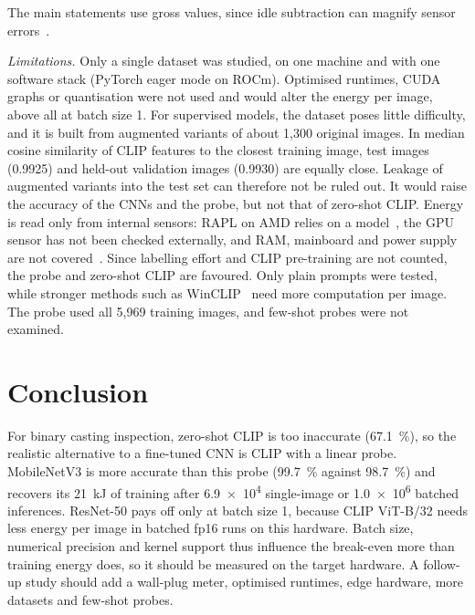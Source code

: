 \documentclass[conference]{IEEEtran}
\begin{document}
The main statements use gross values, since idle subtraction can magnify sensor
errors~\cite{fahad2019comparative}.

\emph{Limitations.} Only a single dataset was studied, on one machine and with one software stack
(PyTorch eager mode on ROCm). Optimised runtimes, CUDA graphs or quantisation were not used and would alter the energy per image,
above all at batch size 1. For supervised models, the dataset poses little difficulty, and it
is built from augmented variants of about 1,300 original images. In median cosine similarity of
CLIP features to the closest training image, test images (0.9925) and held-out validation images
(0.9930) are equally close. Leakage of augmented variants into the test set
can therefore not be ruled out. It would raise the accuracy of the CNNs and the probe, but not that of
zero-shot CLIP. Energy is read only from internal sensors: RAPL on AMD relies on a model~\cite{schoene2021zen2}, the
GPU sensor has not been checked externally, and RAM, mainboard and power supply are not
covered~\cite{jay2023softwaremeters}.
Since labelling effort and CLIP pre-training are not counted, the probe and zero-shot CLIP are
favoured. Only plain prompts were tested, while stronger methods such as
WinCLIP~\cite{jeong2023winclip} need more computation per image. The probe used all 5,969 training images, and few-shot probes were not examined.

\section{Conclusion}
For binary casting inspection, zero-shot CLIP is too inaccurate (\SI{67.1}{\percent}), so the realistic
alternative to a fine-tuned CNN is CLIP with a linear probe. MobileNetV3 is more accurate than this
probe (\SI{99.7}{\percent} against \SI{98.7}{\percent}) and recovers its \SI{21}{kJ} of training
after \num{6.9e4} single-image or \num{1.0e6} batched inferences. ResNet-50 pays off only at batch
size 1, because CLIP ViT-B/32 needs less energy per image in batched fp16 runs on this hardware. Batch
size, numerical precision and kernel support thus influence the break-even more than training energy
does, so it should be measured on the target hardware. A follow-up study should add a wall-plug meter,
optimised runtimes, edge hardware, more datasets and few-shot probes.



\end{document}
